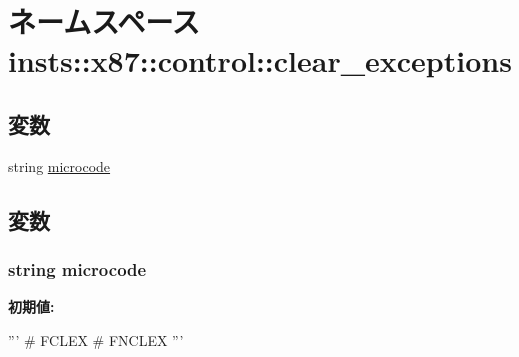 \hypertarget{namespaceinsts_1_1x87_1_1control_1_1clear__exceptions}{
\section{ネームスペース insts::x87::control::clear\_\-exceptions}
\label{namespaceinsts_1_1x87_1_1control_1_1clear__exceptions}
}
\subsection*{変数}
\begin{DoxyCompactItemize}
\item 
string \hyperlink{namespaceinsts_1_1x87_1_1control_1_1clear__exceptions_a770f11a173e99389a8802f0107ed8f52}{microcode}
\end{DoxyCompactItemize}


\subsection{変数}
\hypertarget{namespaceinsts_1_1x87_1_1control_1_1clear__exceptions_a770f11a173e99389a8802f0107ed8f52}{
\subsubsection[{microcode}]{\setlength{\rightskip}{0pt plus 5cm}string {\bf microcode}}}
\label{namespaceinsts_1_1x87_1_1control_1_1clear__exceptions_a770f11a173e99389a8802f0107ed8f52}
{\bfseries 初期値:}
\begin{DoxyCode}
'''
# FCLEX
# FNCLEX
'''
\end{DoxyCode}
